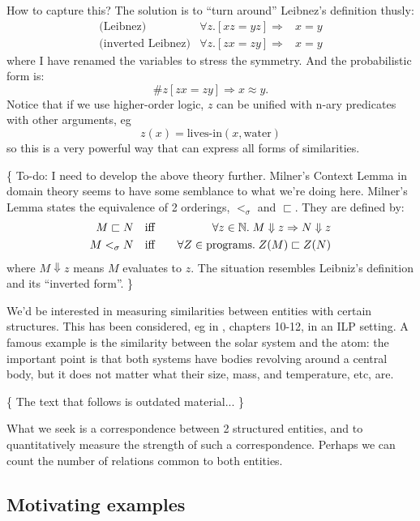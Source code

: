 How to capture this?  The solution is to ``turn around'' Leibnez's definition thusly:
\begin{eqnarray}
\mbox{(Leibnez)}                 & \forall z. [x z = y z] \Rightarrow& x = y \\
\mbox{(inverted Leibnez)}     & \forall z. [z x = z y] \Rightarrow& x = y
\label{eqn:inverted-extensionality}
\end{eqnarray}
where I have renamed the variables to stress the symmetry.  And the probabilistic form is:
\begin{equation}
\# z [z x = z y]  \Rightarrow x \approx y.
\end{equation}
Notice that if we use higher-order logic, $z$ can be unified with n-ary predicates with other arguments, eg
 $$z(x) = \mbox{lives-in}(x, \mbox{water})$$
so this is a very powerful way that can express all forms of similarities.

\{ To-do:  I need to develop the above theory further.  Milner's Context Lemma in domain theory seems to have some semblance to what we're doing here.  Milner's Lemma states the equivalence of 2 orderings, $<_{\sigma}$ and $\sqsubset$.  They are defined by:
\begin{eqnarray}
M \sqsubset N        \quad     & \mbox{iff} &    \quad \forall z \in \mathbb{N}. \; M \Downarrow z \Rightarrow N \Downarrow z \\
M <_{\sigma} N    \quad     & \mbox{iff} &    \quad \forall Z \in \mbox{programs.} \; Z(M) \sqsubset Z(N)
\end{eqnarray}
where $M \Downarrow z$ means $M$ evaluates to $z$.  The situation resembles Leibniz's definition and its ``inverted form''.
\}

We'd be interested in measuring similarities between entities with certain structures.  This has been considered, eg in \citep*{Schmid2003}, chapters 10-12, in an ILP setting.  A famous example is the similarity between the solar system and the atom:  the important point is that both systems have bodies revolving around a central body, but it does not matter what their size, mass, and temperature, etc, are.

\{ The text that follows is outdated material... \}
\underconst

What we seek is a correspondence between 2 structured entities, and to quantitatively measure the strength of such a correspondence.  Perhaps we can count the number of relations common to both entities.

\subsection{Motivating examples}

